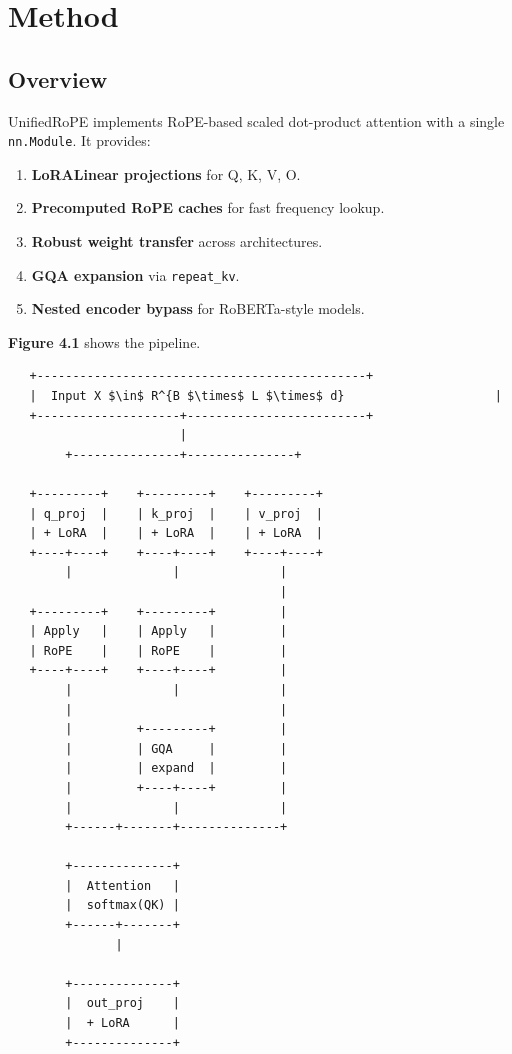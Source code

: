 
\section{Method}

\subsection{Overview}

UnifiedRoPE implements RoPE-based scaled dot-product attention with a 
single \texttt{nn.Module}. It provides:

\begin{enumerate}
\item \textbf{LoRALinear projections} for Q, K, V, O.
\item \textbf{Precomputed RoPE caches} for fast frequency lookup.
\item \textbf{Robust weight transfer} across architectures.
\item \textbf{GQA expansion} via \texttt{repeat\_kv}.
\item \textbf{Nested encoder bypass} for RoBERTa-style models.

\end{enumerate}
\textbf{Figure 4.1} shows the pipeline.

\begin{lstlisting}
   +----------------------------------------------+
   |  Input X $\in$ R^{B $\times$ L $\times$ d}                     |
   +--------------------+-------------------------+
                        |
        +---------------+---------------+
                                         
   +---------+    +---------+    +---------+
   | q_proj  |    | k_proj  |    | v_proj  |
   | + LoRA  |    | + LoRA  |    | + LoRA  |
   +----+----+    +----+----+    +----+----+
        |              |              |
                                      |
   +---------+    +---------+         |
   | Apply   |    | Apply   |         |
   | RoPE    |    | RoPE    |         |
   +----+----+    +----+----+         |
        |              |              |
        |                             |
        |         +---------+         |
        |         | GQA     |         |
        |         | expand  |         |
        |         +----+----+         |
        |              |              |
        +------+-------+--------------+
                
        +--------------+
        |  Attention   |
        |  softmax(QK) |
        +------+-------+
               |
                
        +--------------+
        |  out_proj    |
        |  + LoRA      |
        +--------------+
\end{lstlisting}

